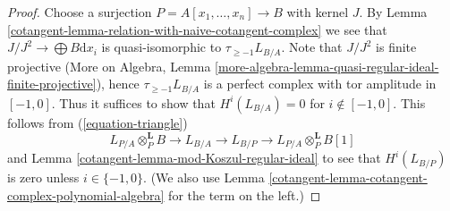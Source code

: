 \begin{proof}

Choose a surjection $P = A[x_1, \ldots, x_n] \to B$ with kernel $J$.
By Lemma \ref{cotangent-lemma-relation-with-naive-cotangent-complex}
we see that $J/J^2 \to \bigoplus B\text{d}x_i$
is quasi-isomorphic to $\tau_{\geq -1}L_{B/A}$.
Note that $J/J^2$ is finite projective
(More on Algebra, Lemma
\ref{more-algebra-lemma-quasi-regular-ideal-finite-projective}),
hence $\tau_{\geq -1}L_{B/A}$ is a perfect complex with
tor amplitude in $[-1, 0]$.
Thus it suffices to show that $H^i(L_{B/A}) = 0$ for $i \not \in [-1, 0]$.
This follows from (\ref{equation-triangle})
$$
L_{P/A} \otimes_P^\mathbf{L} B \to L_{B/A} \to L_{B/P} \to
L_{P/A} \otimes_P^\mathbf{L} B[1]
$$
and Lemma \ref{cotangent-lemma-mod-Koszul-regular-ideal}
to see that $H^i(L_{B/P})$ is zero unless $i \in \{-1, 0\}$.
(We also use Lemma \ref{cotangent-lemma-cotangent-complex-polynomial-algebra}
for the term on the left.)
\end{proof}

